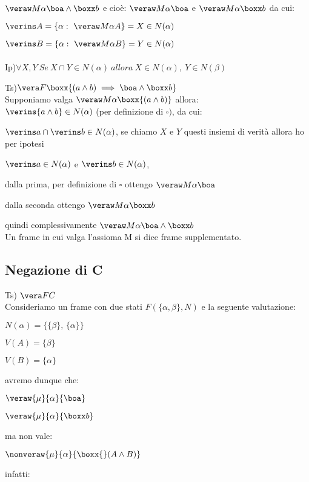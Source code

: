 $\veraw M{\alpha}{\boa\wedge\boxx b}$ e cioè: $\veraw M{\alpha}{\boa}$
e $\veraw M{\alpha}{\boxx b}$ da cui:

$\verins A=\{\alpha:\ \veraw M{\alpha}A\}=X\in N(\alpha)$

$\verins B=\{\alpha:\ \veraw M{\alpha}B\}=Y\in N(\alpha)$	\\
\\
Ip)$\forall X,Y\ Se\ X\cap Y\in N(\alpha)\ allora\ X\in N(\alpha),\ Y\in N(\beta)$

Ts)$\vera F{\boxx{(a\wedge b)\implies\boa\wedge\boxx b}}$\\


Supponiamo valga $\veraw M{\alpha}{\boxx{(a\wedge b)}}$ allora: \\
$\verins{a\wedge b}\in N(\alpha)$ (per definizione di $\square)$,
da cui:

$\verins a\cap\verins b\in N(\alpha)$, se chiamo $X$ e $Y$ questi
insiemi di verità allora ho per ipotesi

$\verins a\in N(\alpha)$ e $\verins b\in N(\alpha)$,

dalla prima, per definizione di $\square$ ottengo $\veraw M{\alpha}{\boa}$

dalla seconda ottengo $\veraw M{\alpha}{\boxx b}$ 

quindi complessivamente $\veraw M{\alpha}{\boa\wedge\boxx b}$\\


Un frame in cui valga l'assioma M si dice frame supplementato.


\subsection{Negazione di C}

Ts) $\vera FC$\\


Consideriamo un frame con due stati $F(\{\alpha,\beta\},N)$ e la
seguente valutazione:

$N(\alpha)=\{\{\beta\},\,\{\alpha\}\}$

$V(A)=\{\beta\}$

$V(B)=\{\alpha\}$

avremo dunque che:

$\veraw{\mu}{\alpha}{\boa}$

$\veraw{\mu}{\alpha}{\boxx b}$

ma non vale:

$\nonveraw{\mu}{\alpha}{\boxx{}(A\wedge B)}$

infatti:


